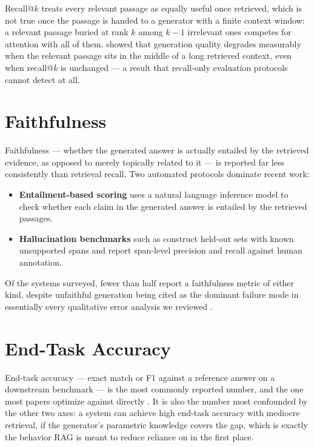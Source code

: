 \documentclass[11pt]{article}
\begin{document}
Recall@$k$ treats every relevant passage as equally useful once
retrieved, which is not true once the passage is handed to a generator
with a finite context window: a relevant passage buried at rank $k$
among $k{-}1$ irrelevant ones competes for attention with all of them.
\Autocite{liu2023lost} showed that generation quality degrades measurably
when the relevant passage sits in the middle of a long retrieved context,
even when recall@$k$ is unchanged --- a result that recall-only
evaluation protocols cannot detect at all.

\section{Faithfulness}
\label{sec:faithfulness}

Faithfulness --- whether the generated answer is actually entailed by
the retrieved evidence, as opposed to merely topically related to it ---
is reported far less consistently than retrieval recall. Two automated
protocols dominate recent work:

\begin{itemize}
  \item \textbf{Entailment-based scoring} \autocite[see][for the
    original formulation]{es2023ragas} uses a natural language inference
    model to check whether each claim in the generated answer is
    entailed by the retrieved passages.
  \item \textbf{Hallucination benchmarks} such as
    \autocite{niu2024ragtruth} construct held-out sets with known
    unsupported spans and report span-level precision and recall
    against human annotation.
\end{itemize}

Of the systems surveyed, fewer than half report a faithfulness metric
of either kind, despite unfaithful generation being cited as the
dominant failure mode in essentially every qualitative error analysis
we reviewed \autocite{niu2024ragtruth,es2023ragas}.

\section{End-Task Accuracy}
\label{sec:endtask}

End-task accuracy --- exact match or F1 against a reference answer on a
downstream benchmark --- is the most commonly reported number, and the
one most papers optimize against directly \autocite{karpukhin2020dpr,lewis2020rag}.
It is also the number most confounded by the other two axes: a system
can achieve high end-task accuracy with mediocre retrieval, if the
generator's parametric knowledge covers the gap, which is exactly the
behavior RAG is meant to reduce reliance on in the first place.
\end{document}
